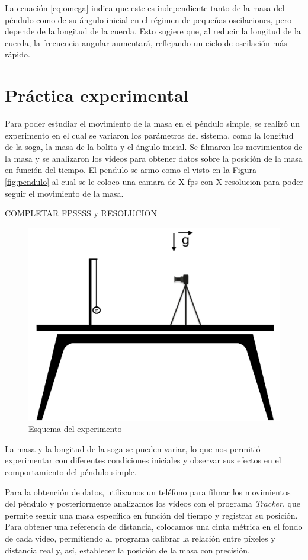 \documentclass[12pt,a4]{article}
\begin{document}
La ecuación \ref{eq:omega} indica que este es independiente tanto de la masa del péndulo como de su ángulo inicial en el régimen de pequeñas oscilaciones, pero depende de la longitud de la cuerda. 
Esto sugiere que, al reducir la longitud de la cuerda, la frecuencia angular aumentará, reflejando un ciclo de oscilación más rápido.

\section{Práctica experimental}

Para poder estudiar el movimiento de la masa en el péndulo simple, se realizó un experimento en el cual se variaron los parámetros del sistema, como la longitud de la soga, la masa de la bolita y el ángulo inicial.
Se filmaron los movimientos de la masa y se analizaron los videos para obtener datos sobre la posición de la masa en función del tiempo.
El pendulo se armo como el visto en la Figura \ref{fig:pendulo} al cual se le coloco una camara de X fps con X resolucion para poder seguir el movimiento de la masa.

COMPLETAR FPSSSS y RESOLUCION

\begin{figure}[H]
    \centering
    \includegraphics[width=0.6\linewidth]{esquema.png}
    \caption{Esquema del experimento}   
    \label{fig:esquema}
\end{figure}

La masa y la longitud de la soga se pueden variar, lo que nos permitió experimentar con diferentes condiciones iniciales y observar sus efectos en el comportamiento del péndulo simple.

Para la obtención de datos, utilizamos un teléfono para filmar los movimientos del péndulo y posteriormente analizamos los videos con el programa \textit{Tracker}, que permite seguir una masa específica en función del tiempo y registrar su posición. 
Para obtener una referencia de distancia, colocamos una cinta métrica en el fondo de cada video, permitiendo al programa calibrar la relación entre píxeles y distancia real y, así, establecer la posición de la masa con precisión.
\end{document}
